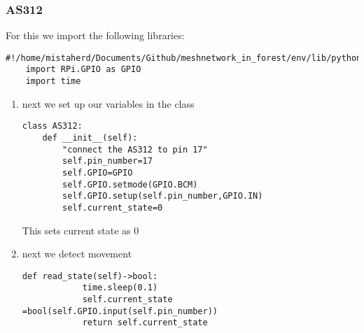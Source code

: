 \subsubsection{AS312}
For this we import the following libraries:
\begin{lstlisting}[style=mystyle]
    #!/home/mistaherd/Documents/Github/meshnetwork_in_forest/env/lib/python3.11
    import RPi.GPIO as GPIO
    import time
\end{lstlisting}
\begin{enumerate}
    \item next  we set up our variables  in the class
    \begin{lstlisting}[style=mystyle]
    class AS312:
	def __init__(self):
		"connect the AS312 to pin 17"
		self.pin_number=17
		self.GPIO=GPIO
		self.GPIO.setmode(GPIO.BCM)
		self.GPIO.setup(self.pin_number,GPIO.IN)
		self.current_state=0
    \end{lstlisting}
    This sets current state as 0
    \item next  we detect  movement
    \begin{lstlisting}[style=mystyle]
        def read_state(self)->bool:
            time.sleep(0.1)
            self.current_state =bool(self.GPIO.input(self.pin_number))
            return self.current_state
    \end{lstlisting}

\end{enumerate}

